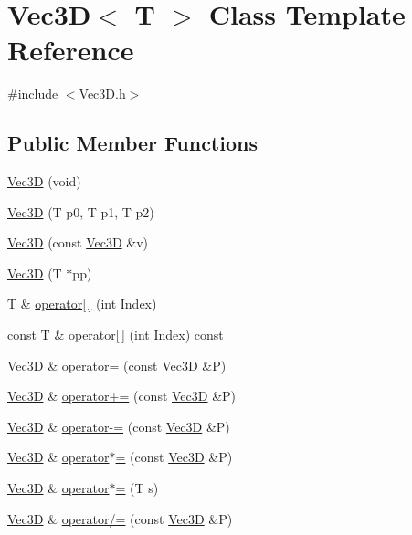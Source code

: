 \hypertarget{class_vec3_d}{
\section{Vec3D$<$ T $>$ Class Template Reference}
\label{class_vec3_d}
}


{\ttfamily \#include $<$Vec3D.h$>$}

\subsection*{Public Member Functions}
\begin{DoxyCompactItemize}
\item 
\hyperlink{class_vec3_d_ac6674d02528970c546e94c5b5660e9d9}{Vec3D} (void)
\item 
\hyperlink{class_vec3_d_ad3cce559bc84474c4adf7fbaf2fdc25f}{Vec3D} (T p0, T p1, T p2)
\item 
\hyperlink{class_vec3_d_a5444e42b09893d7618f61cc1681b082d}{Vec3D} (const \hyperlink{class_vec3_d}{Vec3D} \&v)
\item 
\hyperlink{class_vec3_d_aa947cb0f4fe2f1b8c5bedd6d8a468dcd}{Vec3D} (T $\ast$pp)
\item 
T \& \hyperlink{class_vec3_d_afd2f2055bf7d557b5221f892c9d3327c}{operator\mbox{[}$\,$\mbox{]}} (int Index)
\item 
const T \& \hyperlink{class_vec3_d_a120eb3de5b65fee0bc60e9112d9b626d}{operator\mbox{[}$\,$\mbox{]}} (int Index) const 
\item 
\hyperlink{class_vec3_d}{Vec3D} \& \hyperlink{class_vec3_d_affb5b03bf1784897eb8b23b606fa5140}{operator=} (const \hyperlink{class_vec3_d}{Vec3D} \&P)
\item 
\hyperlink{class_vec3_d}{Vec3D} \& \hyperlink{class_vec3_d_ac79f951e4c65f333cac1ea9bd85ca121}{operator+=} (const \hyperlink{class_vec3_d}{Vec3D} \&P)
\item 
\hyperlink{class_vec3_d}{Vec3D} \& \hyperlink{class_vec3_d_a1004d16ee2afd0c895bcf78fb5d9e9b6}{operator-\/=} (const \hyperlink{class_vec3_d}{Vec3D} \&P)
\item 
\hyperlink{class_vec3_d}{Vec3D} \& \hyperlink{class_vec3_d_aa571a811b94136ed593f20424b1c599a}{operator$\ast$=} (const \hyperlink{class_vec3_d}{Vec3D} \&P)
\item 
\hyperlink{class_vec3_d}{Vec3D} \& \hyperlink{class_vec3_d_acaa4425410f744cb0faefeaf6af3eb22}{operator$\ast$=} (T s)
\item 
\hyperlink{class_vec3_d}{Vec3D} \& \hyperlink{class_vec3_d_a71fb35473004b0bd4d1ef1a8751494fe}{operator/=} (const \hyperlink{class_vec3_d}{Vec3D} \&P)

\end{DoxyCompactItemize}
